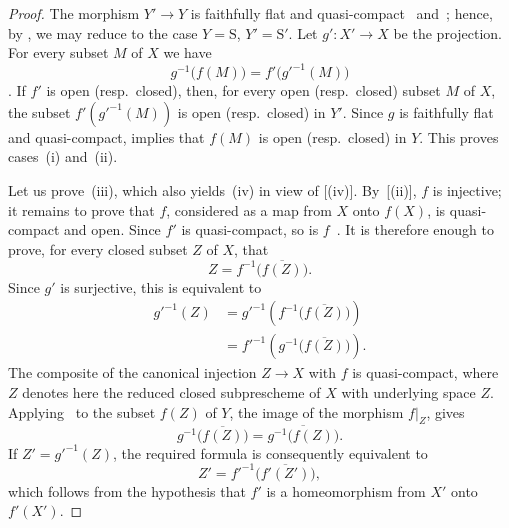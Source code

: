 
\begin{proof}
The morphism $Y'\to Y$ is faithfully flat and
quasi-compact~ and~; hence, by
, we may reduce to the case $Y=\mathrm{S}$,
$Y'=\mathrm{S}'$. Let $g':X'\to X$ be the projection. For every subset
$M$ of $X$ we have
\[
  g^{-1}\bigl(f(M)\bigr)=f'\bigl(g'^{-1}(M)\bigr)
\]
. If $f'$ is open \textnormal{(}resp.\ closed\textnormal{)},
then, for every open \textnormal{(}resp.\ closed\textnormal{)} subset
$M$ of $X$, the subset $f'(g'^{-1}(M))$ is open
\textnormal{(}resp.\ closed\textnormal{)} in $Y'$. Since $g$ is
faithfully flat and quasi-compact,  implies that $f(M)$
is open \textnormal{(}resp.\ closed\textnormal{)} in $Y$. This proves
cases~(i) and~(ii).

Let us prove~(iii), which also yields~(iv) in view of
[(iv)]. By~[(ii)], $f$ is injective; it
remains to prove that $f$, considered as a map from $X$ onto $f(X)$,
is quasi-compact and open. Since $f'$ is quasi-compact, so is
$f$~. It is therefore enough to prove, for every closed
subset $Z$ of $X$, that
\[
  Z=f^{-1}\bigl(\overline{f(Z)}\bigr).
\]
Since $g'$ is surjective, this is equivalent to
\[
\begin{aligned}
  g'^{-1}(Z)
    &=g'^{-1}\!\left(f^{-1}\bigl(\overline{f(Z)}\bigr)\right)\\
    &=f'^{-1}\!\left(g^{-1}\bigl(\overline{f(Z)}\bigr)\right).
\end{aligned}
\]
The composite of the canonical injection $Z\to X$ with $f$ is
quasi-compact, where $Z$ denotes here the reduced closed subprescheme of
$X$ with underlying space $Z$. Applying~ to the subset
$f(Z)$ of $Y$, the image of the morphism $f|_Z$, gives
\[
  g^{-1}\bigl(\overline{f(Z)}\bigr)
  =
  \overline{g^{-1}\bigl(f(Z)\bigr)}.
\]
If $Z'=g'^{-1}(Z)$, the required formula is consequently equivalent to
\[
  Z'=f'^{-1}\bigl(\overline{f'(Z')}\bigr),
\]
which follows from the hypothesis that $f'$ is a homeomorphism from
$X'$ onto $f'(X')$.
\end{proof}

